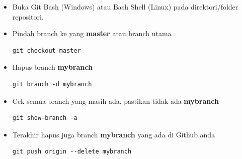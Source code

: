 \documentclass[12pt]{article}
\begin{document}
	\begin{itemize}
		\item Buka Git Bash (Windows) atau Bash Shell (Linux) pada direktori/folder repositori.
		
		\item Pindah branch ke yang \textbf{master} atau branch utama
		\begin{verbatim}
git checkout master
		\end{verbatim}
		
		\item Hapus branch \textbf{mybranch}
		\begin{verbatim}
git branch -d mybranch
		\end{verbatim}
		
		\item Cek semua branch yang masih ada, pastikan tidak ada \textbf{mybranch}
		\begin{verbatim}
git show-branch -a
		\end{verbatim}
		
		\item Terakhir hapus juga branch \textbf{mybranch} yang ada di Github anda
		\begin{verbatim}
git push origin --delete mybranch
		\end{verbatim}
		
	\end{itemize}


%
%	
%	
%	
%	
%	

	
\end{document}
